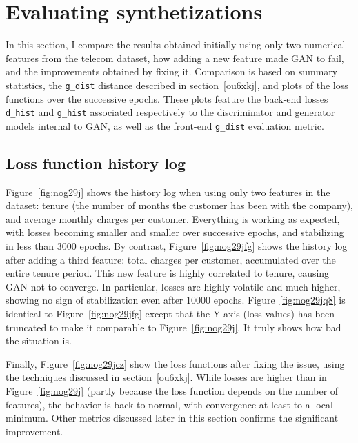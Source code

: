 \documentclass[oneside,10pt]{book}
\begin{document}
\section{Evaluating synthetizations}

In this section, I compare the results obtained initially using only two numerical features from the telecom dataset, how adding a new feature made GAN to fail, and the improvements obtained by fixing it. Comparison is based on summary statistics, the \texttt{g\_dist} distance described in
 section~\ref{ou6xkj}, and plots of the loss functions over the successive epochs. These plots feature the back-end losses
 \texttt{d\_hist} and \texttt{g\_hist} associated respectively to the discriminator and generator models internal to GAN, as well as the 
front-end \texttt{g\_dist} evaluation metric.

\subsection{Loss function history log}

Figure~\ref{fig:nog29j} shows the history log when using only two features in the dataset: tenure (the number of months the customer has been
 with the company), and average monthly charges per customer. Everything is working as expected, with losses becoming smaller and smaller over 
 successive epochs, and stabilizing in less than 3000 epochs. By contrast, Figure~\ref{fig:nog29jfg} shows the history log after adding a third feature: total charges per customer, accumulated over the entire tenure period.  
This new feature is highly correlated to tenure, causing GAN not to converge. In particular, losses are highly volatile and much higher, showing no sign of stabilization even after $\num{10000}$ epochs. Figure~\ref{fig:nog29jq8} is identical to Figure~\ref{fig:nog29jfg} except that the Y-axis (loss values)
 has been truncated to make it comparable to Figure~\ref{fig:nog29j}. It truly shows how bad the situation is.



Finally, Figure~\ref{fig:nog29jcz} show the loss functions after fixing the issue, using the techniques discussed in 
 section~\ref{ou6xkj}. While losses are higher than in Figure~\ref{fig:nog29j} (partly because the loss function depends on the number of features), the
 behavior is back to normal, with convergence at least to a local minimum. Other metrics discussed later in this section confirms the
 significant improvement.
\end{document}
